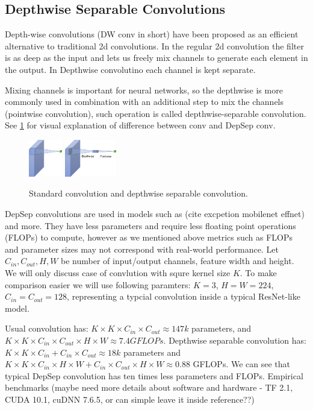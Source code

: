 \subsection{Depthwise Separable Convolutions}

Depth-wise convolutions (DW conv in short) have been proposed as an efficient alternative to traditional 2d convolutions. In the regular 2d convolution the filter is as deep as the input and lets us freely mix channels to generate each element in the output. In Depthwise convolutino each channel is kept separate. 

Mixing channels is important for  neural networks, so the depthwise is more commonly used in combination with an additional step to mix the channels (pointwise convolution), such operation is called depthwise-separable convolution. See \ref{fig: convs} for visual explanation of difference between conv and DepSep conv. 

\begin{figure}[h]
    \centering
         \includegraphics[width=0.13\textwidth]{images/conv.pdf}
         \hfil
         \includegraphics[width=0.2\textwidth]{images/conv_DepSep.pdf}
    \caption{Standard convolution and depthwise separable convolution.}   \label{fig: convs}
    \end{figure}


DepSep convolutions are used in models such as (cite excpetion mobilenet effnet) and more. They have less parameters and require less floating point operations (FLOPs) to compute, however as we mentioned above metrics such as FLOPs and parameter sizes may not correspond with real-world performance. Let $C_{in}, C_{out}, H, W$ be number of input/output channels, feature width and height. We will only discuss case of convlution with squre kernel size $K$. To make comparison easier we will use following paramters: $K=3$, $H=W=224$, $C_{in} = C_{out}=128$, representing a typcial convolution inside a typical ResNet-like model.  

Usual convolution has: $ K \times K \times C_{in} \times C_{out} \approx 147k$ parameters, and $ K \times K \times C_{in} \times C_{out} \times H \times W \approx 7.4 GFLOPs$. Depthwise separable convolution has: $ K \times K \times C_{in} + C_{in} \times C_{out} \approx 18k$ parameters and $ K \times K \times C_{in} \times H \times W + C_{in} \times C_{out} \times H \times W \approx 0.88$ GFLOPs. We can see that typical DepSep convolution has ten times less parameters and FLOPs. Empirical benchmarks %
(maybe need more details about software and hardware - TF 2.1, CUDA 10.1, cuDNN 7.6.5, or can simple leave it inside reference??)

